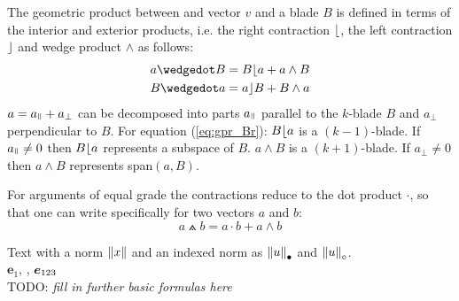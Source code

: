 The geometric product between and vector $v$ and a blade $B$ is defined in terms of the
interior and exterior products, i.e. the right contraction $\lfloor$, the left contraction
$\rfloor$ and wedge product $\wedge$ as follows:
\begin{subequations}
    \begin{align}
    a \wedgedot B & =  B \rcontr a + a \wedge B
    \label{eq:gpr_Br} \\
    B \wedgedot a & =  a \lcontr B + B \wedge a 
    \label{eq:gpr_Bl}
    \end{align}
\end{subequations}
$a = a_{\parall} + a_{\perp}$ can be decomposed into parts $a_{\parall}$ parallel to the
$k$-blade $B$ and $a_{\perp}$ perpendicular to $B$. For equation {(\ref{eq:gpr_Br})}: $B
\lfloor a$ is a $(k-1)$-blade. If $a_{\parall} \neq 0$ then $B \lfloor a$ represents a
subspace of $B$. $a \wedge B$ is a $(k+1)$-blade. If $a_{\perp} \neq 0$ then $a \wedge B$
represents span$(a,B)$.

For arguments of equal grade the contractions reduce to the dot
product $\cdot$, so that one can write specifically for two vectors $a$ and $b$:
\begin{equation}
    a \wedgedot b =  a \cdot b + a \wedge b
\end{equation}

Text with a norm $\left \lVert {x} \right \rVert$ and an indexed norm as ${\left \lVert {u} \right \rVert}_\bullet$ and
${\left \lVert {u} \right \rVert}_\circ$.\\

$\bm{e}_1$, , $\bm{e}_{123}$
\\


TODO: \emph{fill in further basic formulas here}

\newpage